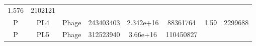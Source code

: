 \documentclass[]{article}
\begin{document}
\begin{longtable}[]{@{}cccccccc@{}}
\begin{minipage}[t]{0.08\columnwidth}
1.576
\strut\end{minipage} &
\begin{minipage}[t]{0.12\columnwidth}\centering\strut
2102121
\strut\end{minipage}\tabularnewline
\begin{minipage}[t]{0.07\columnwidth}\centering\strut
P
\strut\end{minipage} &
\begin{minipage}[t]{0.07\columnwidth}\centering\strut
PL4
\strut\end{minipage} &
\begin{minipage}[t]{0.11\columnwidth}\centering\strut
Phage
\strut\end{minipage} &
\begin{minipage}[t]{0.11\columnwidth}\centering\strut
243403403
\strut\end{minipage} &
\begin{minipage}[t]{0.11\columnwidth}\centering\strut
2.342e+16
\strut\end{minipage} &
\begin{minipage}[t]{0.11\columnwidth}\centering\strut
88361764
\strut\end{minipage} &
\begin{minipage}[t]{0.08\columnwidth}\centering\strut
1.59
\strut\end{minipage} &
\begin{minipage}[t]{0.12\columnwidth}\centering\strut
2299688
\strut\end{minipage}\tabularnewline
\begin{minipage}[t]{0.07\columnwidth}\centering\strut
P
\strut\end{minipage} &
\begin{minipage}[t]{0.07\columnwidth}\centering\strut
PL5
\strut\end{minipage} &
\begin{minipage}[t]{0.11\columnwidth}\centering\strut
Phage
\strut\end{minipage} &
\begin{minipage}[t]{0.11\columnwidth}\centering\strut
312523940
\strut\end{minipage} &
\begin{minipage}[t]{0.11\columnwidth}\centering\strut
3.66e+16
\strut\end{minipage} &
\begin{minipage}[t]{0.11\columnwidth}\centering\strut
110450827
\strut\end{minipage} &
\begin{minipage}[t]{0.08\columnwidth}\centering\strut

\end{minipage}
\end{longtable}
\end{document}
